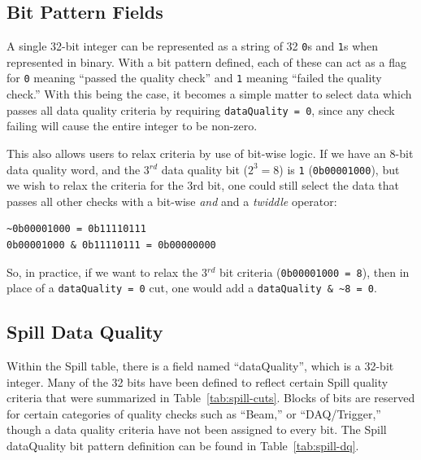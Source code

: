 \subsection{Bit Pattern Fields}

A single 32-bit integer can be represented as a string of 32 \verb|0|s and \verb|1|s when represented in binary. With a bit pattern defined, each of these can act as a flag for \verb|0| meaning ``passed the quality check'' and \verb|1| meaning ``failed the quality check.'' With this being the case, it becomes a simple matter to select data which passes all data quality criteria by requiring \verb|dataQuality = 0|, since any check failing will cause the entire integer to be non-zero.

This also allows users to relax criteria by use of bit-wise logic. If we have an 8-bit data quality word, and the 3$^{rd}$ data quality bit ($2^3=8$) is \verb|1| (\verb|0b00001000|), but we wish to relax the criteria for the 3rd bit, one could still select the data that passes all other checks with a bit-wise \emph{and} and a \emph{twiddle} operator:
\begin{lstlisting}
~0b00001000 = 0b11110111
0b00001000 & 0b11110111 = 0b00000000
\end{lstlisting}
So, in practice, if we want to relax the 3$^{rd}$ bit criteria (\verb|0b00001000 = 8|), then in place of a \verb|dataQuality = 0| cut, one would add a \verb|dataQuality & ~8 = 0|.

\subsection{Spill Data Quality}

Within the Spill table, there is a field named ``dataQuality'', which is a 32-bit integer. Many of the 32 bits have been defined to reflect certain Spill quality criteria that were summarized in Table~\ref{tab:spill-cuts}. Blocks of bits are reserved for certain categories of quality checks such as ``Beam,'' or ``DAQ/Trigger,'' though a data quality criteria have not been assigned to every bit. The Spill dataQuality bit pattern definition can be found in Table~\ref{tab:spill-dq}.

